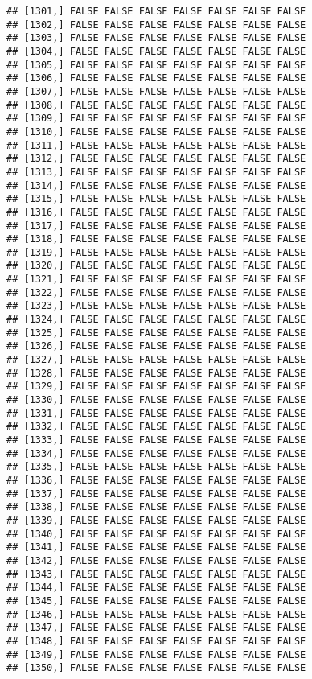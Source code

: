 \documentclass[
]{article}
\begin{document}
\begin{verbatim}
## [1301,] FALSE FALSE FALSE FALSE FALSE FALSE FALSE
## [1302,] FALSE FALSE FALSE FALSE FALSE FALSE FALSE
## [1303,] FALSE FALSE FALSE FALSE FALSE FALSE FALSE
## [1304,] FALSE FALSE FALSE FALSE FALSE FALSE FALSE
## [1305,] FALSE FALSE FALSE FALSE FALSE FALSE FALSE
## [1306,] FALSE FALSE FALSE FALSE FALSE FALSE FALSE
## [1307,] FALSE FALSE FALSE FALSE FALSE FALSE FALSE
## [1308,] FALSE FALSE FALSE FALSE FALSE FALSE FALSE
## [1309,] FALSE FALSE FALSE FALSE FALSE FALSE FALSE
## [1310,] FALSE FALSE FALSE FALSE FALSE FALSE FALSE
## [1311,] FALSE FALSE FALSE FALSE FALSE FALSE FALSE
## [1312,] FALSE FALSE FALSE FALSE FALSE FALSE FALSE
## [1313,] FALSE FALSE FALSE FALSE FALSE FALSE FALSE
## [1314,] FALSE FALSE FALSE FALSE FALSE FALSE FALSE
## [1315,] FALSE FALSE FALSE FALSE FALSE FALSE FALSE
## [1316,] FALSE FALSE FALSE FALSE FALSE FALSE FALSE
## [1317,] FALSE FALSE FALSE FALSE FALSE FALSE FALSE
## [1318,] FALSE FALSE FALSE FALSE FALSE FALSE FALSE
## [1319,] FALSE FALSE FALSE FALSE FALSE FALSE FALSE
## [1320,] FALSE FALSE FALSE FALSE FALSE FALSE FALSE
## [1321,] FALSE FALSE FALSE FALSE FALSE FALSE FALSE
## [1322,] FALSE FALSE FALSE FALSE FALSE FALSE FALSE
## [1323,] FALSE FALSE FALSE FALSE FALSE FALSE FALSE
## [1324,] FALSE FALSE FALSE FALSE FALSE FALSE FALSE
## [1325,] FALSE FALSE FALSE FALSE FALSE FALSE FALSE
## [1326,] FALSE FALSE FALSE FALSE FALSE FALSE FALSE
## [1327,] FALSE FALSE FALSE FALSE FALSE FALSE FALSE
## [1328,] FALSE FALSE FALSE FALSE FALSE FALSE FALSE
## [1329,] FALSE FALSE FALSE FALSE FALSE FALSE FALSE
## [1330,] FALSE FALSE FALSE FALSE FALSE FALSE FALSE
## [1331,] FALSE FALSE FALSE FALSE FALSE FALSE FALSE
## [1332,] FALSE FALSE FALSE FALSE FALSE FALSE FALSE
## [1333,] FALSE FALSE FALSE FALSE FALSE FALSE FALSE
## [1334,] FALSE FALSE FALSE FALSE FALSE FALSE FALSE
## [1335,] FALSE FALSE FALSE FALSE FALSE FALSE FALSE
## [1336,] FALSE FALSE FALSE FALSE FALSE FALSE FALSE
## [1337,] FALSE FALSE FALSE FALSE FALSE FALSE FALSE
## [1338,] FALSE FALSE FALSE FALSE FALSE FALSE FALSE
## [1339,] FALSE FALSE FALSE FALSE FALSE FALSE FALSE
## [1340,] FALSE FALSE FALSE FALSE FALSE FALSE FALSE
## [1341,] FALSE FALSE FALSE FALSE FALSE FALSE FALSE
## [1342,] FALSE FALSE FALSE FALSE FALSE FALSE FALSE
## [1343,] FALSE FALSE FALSE FALSE FALSE FALSE FALSE
## [1344,] FALSE FALSE FALSE FALSE FALSE FALSE FALSE
## [1345,] FALSE FALSE FALSE FALSE FALSE FALSE FALSE
## [1346,] FALSE FALSE FALSE FALSE FALSE FALSE FALSE
## [1347,] FALSE FALSE FALSE FALSE FALSE FALSE FALSE
## [1348,] FALSE FALSE FALSE FALSE FALSE FALSE FALSE
## [1349,] FALSE FALSE FALSE FALSE FALSE FALSE FALSE
## [1350,] FALSE FALSE FALSE FALSE FALSE FALSE FALSE

\end{verbatim}
\end{document}
